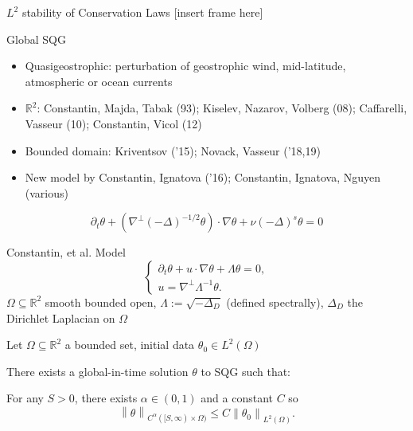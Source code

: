 \documentclass{beamer}
\newcommand{\R}{\mathbb{R}}
\newcommand{\norm}[1]{\left\lVert#1\right\rVert}
\newcommand{\paren}[1]{\left( #1 \right)}
\newcommand{\del}{\partial}
\newcommand{\grad}{\nabla}
\newcommand{\Laplace}{\Delta}
\begin{document}

\begin{frame}{$L^2$ stability of Conservation Laws}
[insert frame here]
\end{frame}


\begin{frame}{Global SQG}
\begin{itemize}
\item Quasigeostrophic: perturbation of geostrophic wind, mid-latitude, atmospheric or ocean currents \\
\item $\R^2$: Constantin, Majda, Tabak (93); Kiselev, Nazarov, Volberg (08); Caffarelli, Vasseur (10); Constantin, Vicol (12)
\item Bounded domain: Kriventsov ('15); Novack, Vasseur ('18,19)
\item New model by Constantin, Ignatova ('16); Constantin, Ignatova, Nguyen (various)
\end{itemize}

\[ \del_t \theta + \paren{\grad^\perp (-\Laplace)^{-1/2} \theta} \cdot \grad \theta + \nu (-\Laplace)^s \theta = 0 \]
\end{frame}


\begin{frame}{Constantin, et al. Model}
\begin{equation}\begin{cases}
\del_t \theta + u \cdot \grad \theta + \Lambda \theta = 0, \\
u = \grad^\perp \Lambda^{-1} \theta.
\end{cases} \end{equation}
$\Omega \subseteq \R^2$ smooth bounded open, $\Lambda := \sqrt{-\Laplace_D}$ (defined spectrally), $\Laplace_D$ the Dirichlet Laplacian on $\Omega$

%
%
\begin{theorem}[S., Vasseur]
Let $\Omega \subseteq \R^2$ a bounded set, initial data $\theta_0 \in L^2(\Omega)$

There exists a global-in-time solution $\theta$ to SQG such that:

For any $S > 0$, there exists $\alpha \in (0,1)$ and a constant $C$ so
\[ \norm{\theta}_{C^\alpha([S,\infty)\times\Omega)} \leq C \norm{\theta_0}_{L^2(\Omega)}. \]
\end{theorem}

\end{frame}
\end{document}
